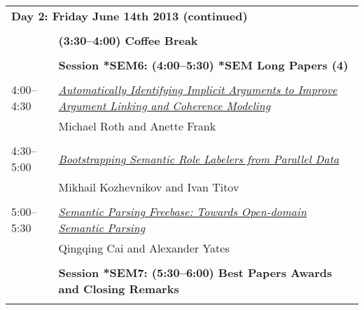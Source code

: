 \newpage
\begin{tabular}{p{20mm}p{138mm}}
\\
\multicolumn{2}{l}{\bf Day 2: Friday June 14th 2013 (continued)} \\\\
 & {\bf (3:30--4:00) Coffee Break} \\
\\
 & {\bf Session *SEM6: (4:00--5:30) *SEM Long Papers (4)} \\
\\
4:00--4:30 & \hyperlink{page.305}{\em Automatically Identifying Implicit Arguments to Improve Argument Linking and Coherence Modeling}\\
         & Michael Roth and Anette Frank \\
\\

4:30--5:00 & \hyperlink{page.316}{\em Bootstrapping Semantic Role Labelers from Parallel Data}\\
         & Mikhail Kozhevnikov and Ivan Titov \\
\\

5:00--5:30 & \hyperlink{page.327}{\em Semantic Parsing Freebase: Towards Open-domain Semantic Parsing}\\
         & Qingqing Cai and Alexander Yates \\
\\

 & {\bf Session *SEM7: (5:30--6:00) Best Papers Awards and Closing Remarks} \\
\\


\end{tabular}

